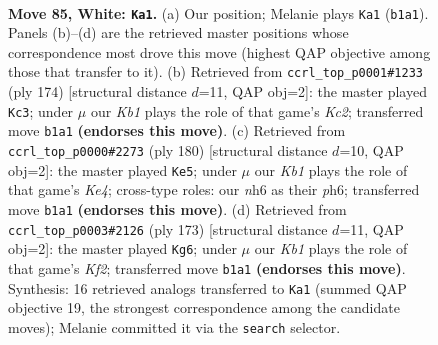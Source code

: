 \documentclass[11pt]{article}
\begin{document}
\clearpage

\begin{figure}[p]\centering
\begin{subfigure}{0.46\textwidth}\centering
\resizebox{\linewidth}{!}{%
\newchessgame
\chessboard[
  setfen={7k/P7/1P5n/8/8/8/7r/1K2R3 w - - 5 85},
  showmover=false,
  pgfstyle=straightmove, color=movearrow, markmove={b1-a1}
]}
\caption{}
\end{subfigure}\hfill
\begin{subfigure}{0.46\textwidth}\centering
\resizebox{\linewidth}{!}{%
\newchessgame
\chessboard[
  setfen={8/8/3k4/8/1r2p3/8/R1K2P2/8 w - - 2 88},
  showmover=false,
  pgfstyle=straightmove, color=movearrow, markmove={c2-c3}
]}
\caption{}
\end{subfigure}
\\[4pt]
\begin{subfigure}{0.46\textwidth}\centering
\resizebox{\linewidth}{!}{%
\newchessgame
\chessboard[
  setfen={5r1k/8/7p/7P/R3K1P1/8/8/8 w - - 71 91},
  showmover=false,
  pgfstyle=straightmove, color=movearrow, markmove={e4-e5}
]}
\caption{}
\end{subfigure}\hfill
\begin{subfigure}{0.46\textwidth}\centering
\resizebox{\linewidth}{!}{%
\newchessgame
\chessboard[
  setfen={8/3r1k2/8/6p1/6P1/8/6K1/1R6 b - - 5 87},
  showmover=false,
  pgfstyle=straightmove, color=movearrow, markmove={f7-g6}
]}
\caption{}
\end{subfigure}
\caption{\textbf{Move 85, White: \texttt{Ka1}.} (a) Our position; Melanie plays \texttt{Ka1} (\texttt{b1a1}). Panels (b)--(d) are the retrieved master positions whose correspondence most drove this move (highest QAP objective among those that transfer to it). (b) Retrieved from \texttt{ccrl\_top\_p0001\#1233} (ply 174) [structural distance $d$=11, QAP obj=2]: the master played \texttt{Kc3}; under $\mu$ our \emph{Kb1} plays the role of that game's \emph{Kc2}; transferred move \texttt{b1a1} \textbf{(endorses this move)}. (c) Retrieved from \texttt{ccrl\_top\_p0000\#2273} (ply 180) [structural distance $d$=10, QAP obj=2]: the master played \texttt{Ke5}; under $\mu$ our \emph{Kb1} plays the role of that game's \emph{Ke4}; cross-type roles: our \emph{n}h6 as their \emph{p}h6; transferred move \texttt{b1a1} \textbf{(endorses this move)}. (d) Retrieved from \texttt{ccrl\_top\_p0003\#2126} (ply 173) [structural distance $d$=11, QAP obj=2]: the master played \texttt{Kg6}; under $\mu$ our \emph{Kb1} plays the role of that game's \emph{Kf2}; transferred move \texttt{b1a1} \textbf{(endorses this move)}. Synthesis: 16 retrieved analogs transferred to \texttt{Ka1} (summed QAP objective 19, the strongest correspondence among the candidate moves); Melanie committed it via the \texttt{search} selector.}
\label{fig:thought-m168}
\end{figure}
\end{document}
